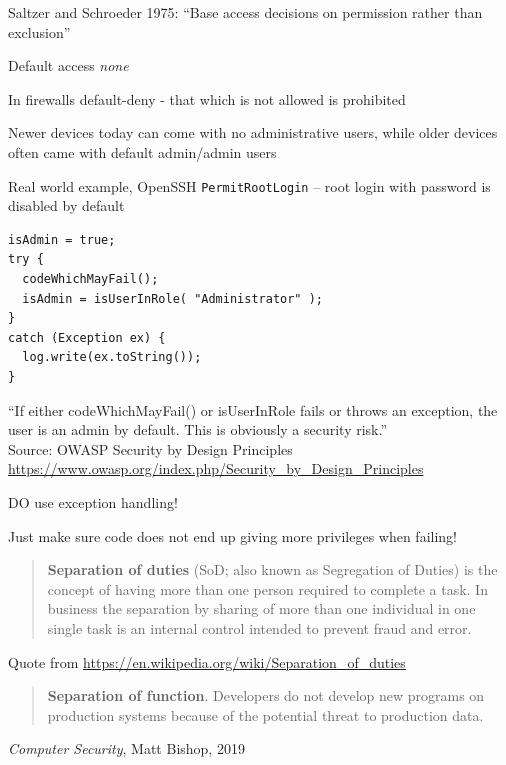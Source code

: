 \documentclass[Screen16to9,17pt]{foils}
\begin{document}
\begin{list2}
\item Saltzer and Schroeder 1975: ``Base access decisions on permission rather than exclusion''
\item Default access \emph{none}
\item In firewalls default-deny - that which is not allowed is prohibited
\item Newer devices today can come with no administrative users, while older devices often came with default admin/admin users
\item Real world example, OpenSSH \verb+PermitRootLogin+ -- root login with password is disabled by default
\end{list2}


\begin{verbatim}
isAdmin = true;
try {
  codeWhichMayFail();
  isAdmin = isUserInRole( "Administrator" );
}
catch (Exception ex) {
  log.write(ex.toString());
}
\end{verbatim}
``If either codeWhichMayFail() or isUserInRole fails or throws an exception, the user is an admin by default. This is obviously a security risk.''\\
Source: OWASP Security by Design Principles\\
\url{https://www.owasp.org/index.php/Security_by_Design_Principles}

\begin{list2}
\item DO use exception handling!
\item Just make sure code does not end up giving more privileges when failing!
\end{list2}




\begin{quote}
{\bf Separation of duties} (SoD; also known as Segregation of Duties) is the concept of having more than one person required to complete a task. In business the separation by sharing of more than one individual in one single task is an internal control intended to prevent fraud and error.
\end{quote}

Quote from \url{https://en.wikipedia.org/wiki/Separation_of_duties}

\begin{quote}
{\bf Separation of function}. Developers do not develop new programs on production systems because of the potential threat to production data.
\end{quote}
\emph{Computer Security}, Matt Bishop, 2019
\end{document}
